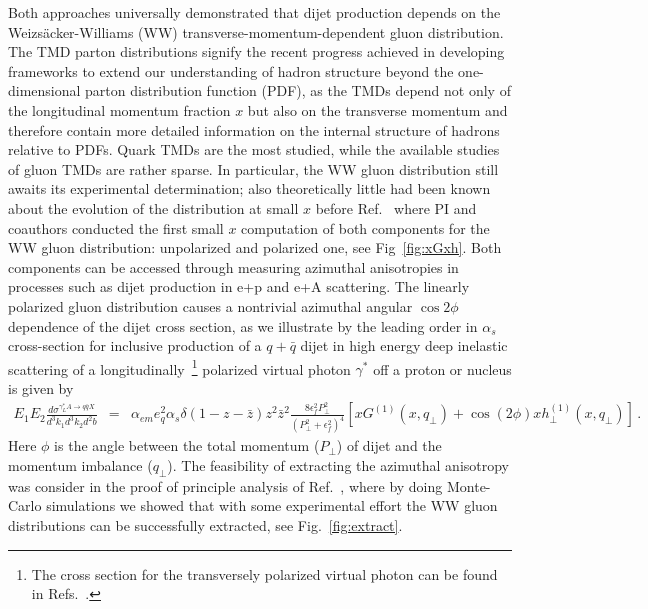 Both approaches universally demonstrated that  dijet production depends on   
the Weiz\-s\"acker-Williams (WW) transverse-momentum-dependent  gluon distribution.  
The TMD parton distributions signify the recent progress achieved in developing 
frameworks to extend our understanding of hadron structure  beyond the one-dimensional
parton distribution function (PDF), as the TMDs depend not only of the longitudinal momentum 
fraction $x$ but also on the transverse momentum and therefore contain more 
detailed information on the internal structure of hadrons relative to PDFs.
Quark TMDs are the most studied, while the available studies of gluon TMDs 
are rather sparse. In particular, the WW gluon distribution still awaits its experimental 
determination; also theoretically little had been known about the evolution of the distribution at small $x$ 
before Ref.~\cite{Dumitru:2015gaa} where PI and coauthors conducted the first small $x$ computation of 
both components for the WW gluon distribution: unpolarized and polarized one, see Fig~\ref{fig:xGxh}. 
Both components can be accessed through measuring azimuthal anisotropies in processes 
such as dijet production in e+p and e+A scattering. The linearly polarized
gluon distribution causes  a nontrivial azimuthal angular $\cos 2\phi$ dependence of the dijet cross section, 
as we illustrate by the leading order in $\alpha_s$  cross-section for inclusive
production of a $q+\bar q$ dijet in high energy deep inelastic
scattering of a longitudinally~\footnote{The cross section for the transversely polarized virtual photon can be found in Refs.~\cite{Metz:2011wb,Dominguez:2011wm}.} polarized virtual photon $\gamma^*$ off a proton or nucleus is
given by~\cite{Metz:2011wb,Dominguez:2011wm}
\begin{eqnarray}
E_1E_2
\frac{d\sigma ^{\gamma _{L}^{\ast }A\rightarrow q\bar{q}X}}{d^3k_1d^3k_2 d^2b}
&=&\alpha _{em}e_{q}^{2}\alpha _{s}\delta \left( 1-z-\bar z\right) z^2\bar z^2\frac{8\epsilon _{f}^{2}{P}_{\perp }^{2}}{(
{P}_{\perp }^{2}+\epsilon _{f}^{2})^{4}}  %
\left[ xG^{(1)}(x,q_{\perp })+\cos \left(2
  \phi\right)xh_{\perp }^{(1)}(x,q_{\perp })\right]\, .
\label{eq:dijet_L}
\end{eqnarray}
Here $\phi$ is the angle between the total momentum  ($P_\perp$) of dijet and the momentum imbalance  ($q_\perp$).
The feasibility of extracting the azimuthal anisotropy was 
consider in the proof of principle analysis of  Ref.~\cite{TODO}, where by doing Monte-Carlo simulations 
we showed that with some experimental effort the WW gluon distributions can
be successfully extracted, see Fig.~\ref{fig:extract}.

